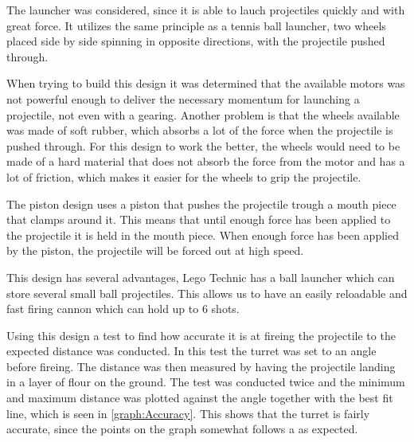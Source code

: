 The launcher was considered, since it is able to lauch projectiles quickly and
with great force. It utilizes the same principle as a tennis ball launcher, two
wheels placed side by side spinning in opposite directions, with the projectile
pushed through.


When trying to build this design it was determined that the available motors was
not powerful enough to deliver the necessary momentum for launching a
projectile, not even with a gearing. Another problem is that the wheels
available was made of soft rubber, which absorbs a lot of the force when the
projectile is pushed through. For this design to work the better, the wheels
would need to be made of a hard material that does not absorb the force from the
motor and has a lot of friction, which makes it easier for the wheels to
grip the projectile.\nl

The piston design uses a piston that pushes the projectile trough a mouth piece
that clamps around it. This means that until enough force has been applied to
the projectile it is held in the mouth piece. When enough force has been
applied by the piston, the projectile will be forced out at high speed.


This design has several advantages, Lego Technic has a ball launcher which can
store several small ball projectiles. This allows us to have an easily
reloadable and fast firing cannon which can hold up to 6 shots.\nl

Using this design a test to find how accurate it is at fireing the projectile
to the expected distance was conducted.
In this test the turret was set to an angle before fireing. The distance was
then measured by having the projectile landing in a layer of flour on the
ground. The test was conducted twice and the minimum and maximum distance was
plotted against the angle together with the best fit line, which is seen in
\autoref{graph:Accuracy}.
This shows that the turret is fairly accurate, since the points on
the graph somewhat follows a  as
expected.


